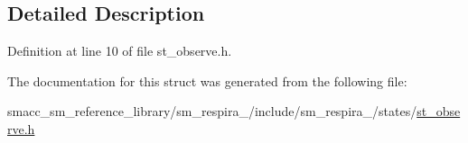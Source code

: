 \subsection{Detailed Description}


Definition at line 10 of file st\+\_\+observe.\+h.



The documentation for this struct was generated from the following file\+:\begin{DoxyCompactItemize}
\item 
smacc\+\_\+sm\+\_\+reference\+\_\+library/sm\+\_\+respira\+\_/include/sm\+\_\+respira\+\_/states/\hyperlink{sm__respira__1_2include_2sm__respira__1_2states_2st__observe_8h}{st\+\_\+observe.\+h}\end{DoxyCompactItemize}
